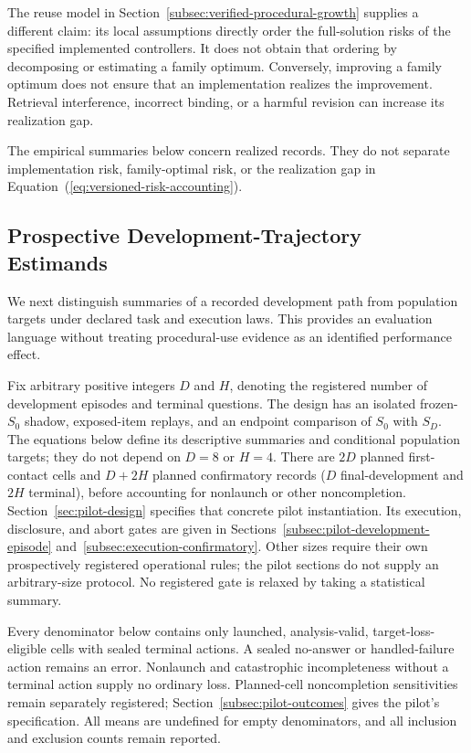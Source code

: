 \documentclass[10pt]{article} %
\renewcommand{\eqref}[1]{\textup{(\ref{#1})}}
\providecommand{\1}{\mathbf{1}}  %
\theoremstyle{remark}
\theoremstyle{definition}
\begin{document}
The reuse model in Section~\ref{subsec:verified-procedural-growth} supplies a different
claim: its local assumptions directly order the full-solution risks of
the specified implemented controllers. It does not obtain that ordering
by decomposing or estimating a family optimum. Conversely, improving a
family optimum does not ensure that an implementation realizes the
improvement. Retrieval interference, incorrect binding, or a harmful
revision can increase its realization gap.

The empirical summaries below concern realized records. They do not
separate implementation risk, family-optimal risk, or the realization
gap in Equation~\eqref{eq:versioned-risk-accounting}.

\subsection{Prospective Development-Trajectory Estimands}
\label{subsec:adaptive-estimands}

We next distinguish summaries of a recorded development path from
population targets under declared task and execution laws. This provides
an evaluation language without treating procedural-use evidence as an
identified performance effect.

Fix arbitrary positive integers $D$ and $H$, denoting the registered number
of development episodes and terminal questions. The design has an isolated
frozen-$S_0$ shadow, exposed-item replays, and an endpoint comparison of
$S_0$ with $S_D$. The equations below define its descriptive summaries and
conditional population targets; they do not depend on $D=8$ or $H=4$.
There are $2D$ planned first-contact cells and $D+2H$ planned confirmatory
records ($D$ final-development and $2H$ terminal), before accounting for
nonlaunch or other noncompletion.
Section~\ref{sec:pilot-design} specifies that concrete pilot instantiation.
Its execution, disclosure, and abort gates are given in
Sections~\ref{subsec:pilot-development-episode}
and~\ref{subsec:execution-confirmatory}. Other sizes require their own
prospectively registered operational rules; the pilot sections do not
supply an arbitrary-size protocol. No registered gate is relaxed by
taking a statistical summary.

Every denominator below contains only launched, analysis-valid,
target-loss-eligible cells with sealed terminal actions. A sealed
no-answer or handled-failure action remains an error. Nonlaunch and
catastrophic incompleteness without a terminal action supply no ordinary
loss. Planned-cell noncompletion sensitivities remain separately
registered; Section~\ref{subsec:pilot-outcomes} gives the pilot's
specification. All means are undefined for empty
denominators, and all inclusion and exclusion counts remain reported.
\end{document}
